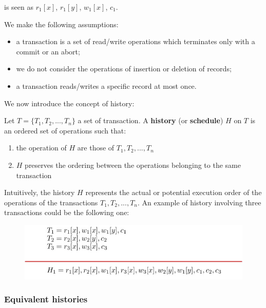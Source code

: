 is seen as $r_1[x]$, $r_1[y]$, $w_1[x]$, $c_1$. 

We make the following assumptions:

\begin{itemize}

    \item a transaction is a set of read/write operations which terminates only with a commit or an abort;
    
    \item we do not consider the operations of insertion or deletion of records;

    \item a transaction reads/writes a specific record at most once.
    
\end{itemize}

We now introduce the concept of history:

\begin{tcolorbox}

 Let $T = \{T_1, T_2, ..., T_n\}$ a set of transaction. A \textbf{history} (or \textbf{schedule}) $H$ on $T$ is an ordered set of operations such that: 

 \begin{enumerate}
     \item the operation of $H$ are those of $T_1, T_2, ..., T_n$
     \item $H$ preserves the ordering between the operations belonging to the same transaction
 \end{enumerate}


\end{tcolorbox}

Intuitively, the history $H$ represents the actual or potential execution order of the operations of the transactions $T_1, T_2, ..., T_n$. An example of history involving three transactions could be the following one:

\begin{figure}[h!]
		\centering
		\includegraphics[scale = 1.5]{img/conc3.jpg}
		\label{tr10}
\end{figure}

\subsubsection{Equivalent histories}

